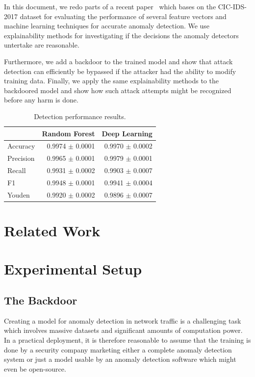 \documentclass[10pt,sigconf,letterpaper,dvipsnames]{acmart}
\begin{document}
In this document, we redo parts of a recent paper~\cite{fares} which bases on the CIC-IDS-2017 dataset \cite{Sharafaldin2018} for evaluating the performance of several feature vectors and machine learning techniques for accurate anomaly detection. We use explainability methods for investigating if the decisions the anomaly detectors untertake are reasonable.

Furthermore, we add a backdoor to the trained model and show that attack detection can efficiently be bypassed if the attacker had the ability to modify training data. Finally, we apply the same explainability methods to the backdoored model and show how such attack attempts might be recognized before any harm is done.


\begin{table}[b]
\caption{Detection performance results.} \label{tab:performance_results}
\begin{tabular}{l r r} \toprule
& Random Forest & Deep Learning \\ \midrule
Accuracy	&	0.9974 $\pm$ 0.0001	&	0.9970 $\pm$ 0.0002	\\
Precision	&	0.9965 $\pm$ 0.0001	&	0.9979 $\pm$ 0.0001	\\
Recall	&	0.9931 $\pm$ 0.0002	&	0.9903 $\pm$ 0.0007	\\
F1	&	0.9948 $\pm$ 0.0001	&	0.9941 $\pm$ 0.0004	\\
Youden	&	0.9920 $\pm$ 0.0002	&	0.9896 $\pm$ 0.0007	\\
\bottomrule
\end{tabular}
\end{table}

\section{Related Work}

\section{Experimental Setup} \label{sec:ml_approaches}
\subsection{The Backdoor}
Creating a model for anomaly detection in network traffic is a challenging task which involves massive datasets and significant amounts of computation power. In a practical deployment, it is therefore reasonable to assume that the training is done by a security company marketing either a complete anomaly detection system or just a model usable by an anomaly detection software which might even be open-source.
\end{document}
